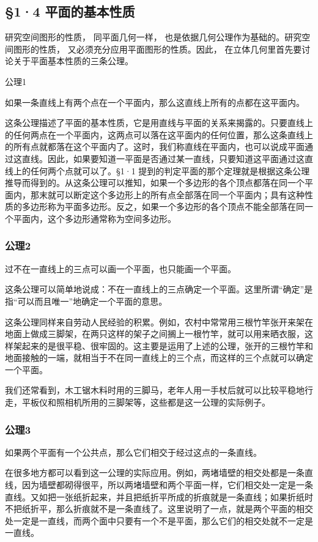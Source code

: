 \subsection{§1·4
平面的基本性质}

研究空间图形的性质， 同平面几何一样，
也是依据几何公理作为基础的。研究空间图形的性质，
又必须充分应用平面图形的性质。因此，
在立体几何里首先要讨论关于平面基本性质的三条公理。

公理1

如果一条直线上有两个点在一个平面内，那么这直线上所有的点都在这平面内。

这条公理描述了平面的基本性质，它是用直线与平面的关系来揭露的。只要直线上的任何两点在一个平面内，这两点可以落在这平面内的任何位置，那么这条直线上的所有点就都落在这个平面内了。这时，我们称直线在平面内，也可以说成平面通过这直线。因此，如果要知道一平面是否通过某一直线，只要知道这平面通过这直线上的任何两个点就可以了。§1·1
提到的判定平面的那个定理就是根据这条公理推导而得到的。从这条公理可以推知，如果一个多边形的各个顶点都落在同一个平面内，那末就可以断定这个多边形上的所有点全部落在同一个平面内；具有这种性质的多边形称为平面多边形。反之，如果一个多边形的各个顶点不能全部落在同一个平面内，这个多边形通常称为空间多边形。

\subsubsection{公理2}

过不在一直线上的三点可以画一个平面，也只能画一个平面。

这条公理可以简单地说成：不在一直线上的三点确定一个平面。这里所谓``确定''是指``可以而且唯一''地确定一个平面的意思。

这条公理同样来自劳动人民经验的积累。例如，农村中常常用三根竹竿张开来架在地面上做成三脚架，在两只这样的架子之间搁上一根竹竿，就可以用来晒衣服，这样架起来的是很平稳、很牢固的。这主要是运用了上述的公理，张开的三根竹竿和地面接触的一端，就相当于不在同一直线上的三个点，而这样的三个点就可以确定一个平面。

我们还常看到，木工锯木料时用的三脚马，老年人用一手杖后就可以比较平稳地行走，平板仪和照相机所用的三脚架等，这些都是这一公理的实际例子。

\subsubsection{公理3}

如果两个平面有一个公共点，那么它们相交于经过这点的一条直线。

在很多地方都可以看到这一公理的实际应用。例如，两堵墙壁的相交处都是一条直线，因为墙壁都砌得很平，所以两堵墙壁和两个平面一样，它们相交处一定是一条直线。又如把一张纸折起来，并且把纸折平所成的折痕就是一条直线；如果折纸时不把纸折平，那么折痕就不是一条直线了。这里说明了一点，就是两个平面的相交处一定是一直线，而两个面中只要有一个不是平面，那么它们的相交处就不一定是一直线。

